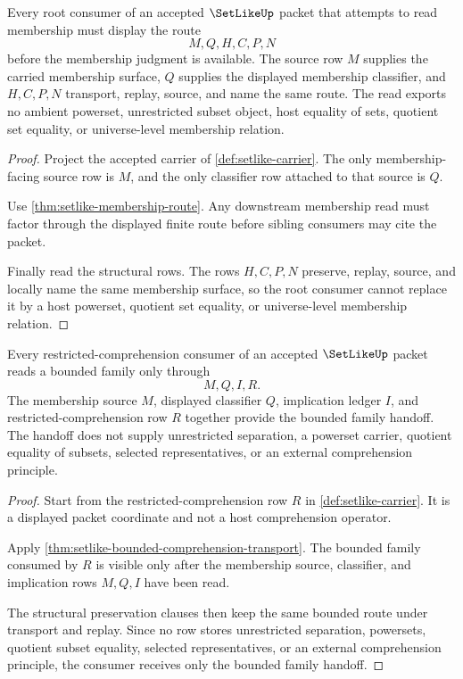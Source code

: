 \begin{theorem}
\label{thm:setlike-root-membership-obligation}
Every root consumer of an accepted $\SetLikeUp$ packet that attempts to read membership must display the route
$$
M,Q,H,C,P,N
$$
before the membership judgment is available. The source row $M$ supplies the carried membership surface, $Q$ supplies the displayed membership classifier, and $H,C,P,N$ transport, replay, source, and name the same route. The read exports no ambient powerset, unrestricted subset object, host equality of sets, quotient set equality, or universe-level membership relation.
\end{theorem}
\begin{proof}
Project the accepted carrier of \autoref{def:setlike-carrier}. The only membership-facing source row is $M$, and the only classifier row attached to that source is $Q$.

Use \autoref{thm:setlike-membership-route}. Any downstream membership read must factor through the displayed finite route before sibling consumers may cite the packet.

Finally read the structural rows. The rows $H,C,P,N$ preserve, replay, source, and locally name the same membership surface, so the root consumer cannot replace it by a host powerset, quotient set equality, or universe-level membership relation.
\end{proof}

\begin{theorem}
\label{thm:setlike-bounded-comprehension-family-handoff}
Every restricted-comprehension consumer of an accepted $\SetLikeUp$ packet reads a bounded family only through
$$
M,Q,I,R .
$$
The membership source $M$, displayed classifier $Q$, implication ledger $I$, and restricted-comprehension row $R$ together provide the bounded family handoff. The handoff does not supply unrestricted separation, a powerset carrier, quotient equality of subsets, selected representatives, or an external comprehension principle.
\end{theorem}
\begin{proof}
Start from the restricted-comprehension row $R$ in \autoref{def:setlike-carrier}. It is a displayed packet coordinate and not a host comprehension operator.

Apply \autoref{thm:setlike-bounded-comprehension-transport}. The bounded family consumed by $R$ is visible only after the membership source, classifier, and implication rows $M,Q,I$ have been read.

The structural preservation clauses then keep the same bounded route under transport and replay. Since no row stores unrestricted separation, powersets, quotient subset equality, selected representatives, or an external comprehension principle, the consumer receives only the bounded family handoff.
\end{proof}

